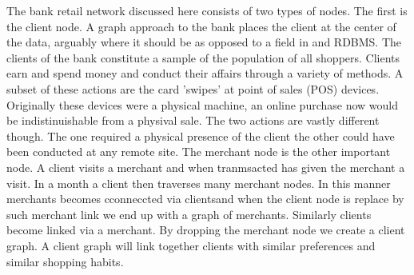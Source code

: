 The bank retail network discussed here consists of two types of nodes. The first is the client node.  A graph approach to the bank places the client at the center of the data, arguably where it should be as opposed to a field in and RDBMS.  The clients of the bank constitute a sample of the population of all shoppers. Clients earn and spend money and conduct their affairs through a variety of methods.  A subset of these actions are the card 'swipes' at point of sales (POS) devices.  Originally these devices were a physical machine, an online purchase now would be indistinuishable from a physival sale.  The two actions are vastly different though.  The one required a physical presence of the client the other could have been conducted at any remote site.
The merchant node is the other important node.  A client visits a merchant and when tranmsacted has given the merchant a visit.  In a month a client then traverses many merchant nodes.  In this manner merchants becomes cconneccted via clientsand when the client node is replace by such merchant link we end up with a graph of merchants.
Similarly clients become linked via a merchant.  By dropping the merchant node we create a client graph.  A client graph will link together clients with similar preferences and similar shopping habits.

